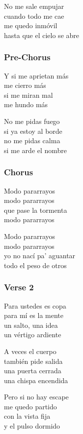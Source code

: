 No me sale empujar\\
cuando todo me cae\\
me quedo inmóvil\\
hasta que el cielo se abre

\subsubsection{Pre-Chorus}\label{pre-chorus-2}

Y si me aprietan más\\
me cierro más\\
si me miran mal\\
me hundo más

No me pidas fuego\\
si ya estoy al borde\\
no me pidas calma\\
si me arde el nombre

\subsubsection{Chorus}\label{chorus-10}

Modo pararrayos\\
modo pararrayos\\
que pase la tormenta\\
modo pararrayos

Modo pararrayos\\
modo pararrayos\\
yo no nací pa' aguantar\\
todo el peso de otros

\subsubsection{Verse 2}\label{verse-2-3}

Para ustedes es copa\\
para mí es la mente\\
un salto, una idea\\
un vértigo ardiente

A veces el cuerpo\\
también pide salida\\
una puerta cerrada\\
una chispa encendida

Pero si no hay escape\\
me quedo partido\\
con la vista fija\\
y el pulso dormido

